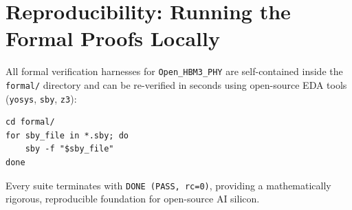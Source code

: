 \documentclass[journal,10pt,twocolumn]{IEEEtran}
\begin{document}
\section{Reproducibility: Running the Formal Proofs Locally}

All formal verification harnesses for \texttt{Open\_HBM3\_PHY} are self-contained inside the \texttt{formal/} directory and can be re-verified in seconds using open-source EDA tools (\texttt{yosys}, \texttt{sby}, \texttt{z3}):

\begin{footnotesize}\begin{verbatim}
cd formal/
for sby_file in *.sby; do
    sby -f "$sby_file"
done
\end{verbatim}\end{footnotesize}

Every suite terminates with \texttt{DONE (PASS, rc=0)}, providing a mathematically rigorous, reproducible foundation for open-source AI silicon.
\end{document}
